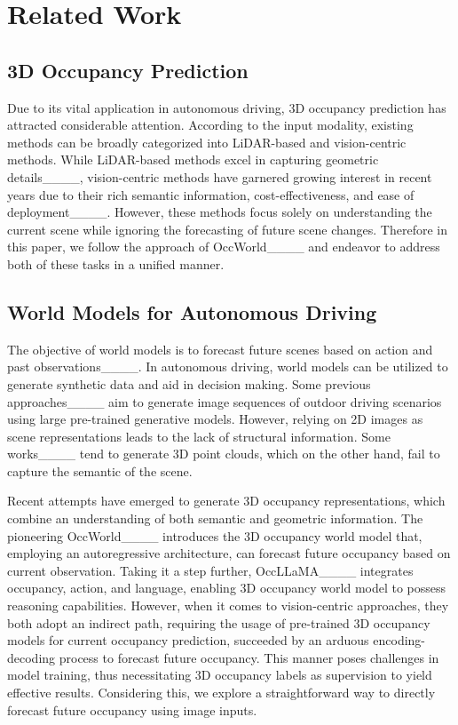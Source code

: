 \section{Related Work}
\label{related_work}

\subsection{3D Occupancy Prediction}

Due to its vital application in autonomous driving, 3D occupancy prediction has attracted considerable attention. According to the input modality, existing methods can be broadly categorized into LiDAR-based and vision-centric methods. While LiDAR-based methods excel in capturing geometric details____, vision-centric methods have garnered growing interest in recent years due to their rich semantic information, cost-effectiveness, and ease of deployment____. However, these methods focus solely on understanding the current scene while ignoring the forecasting of future scene changes. Therefore in this paper, we follow the approach of OccWorld____ and endeavor to address both of these tasks in a unified manner.

\subsection{World Models for Autonomous Driving}

The objective of world models is to forecast future scenes based on action and past observations____. In autonomous driving, world models can be utilized to generate synthetic data and aid in decision making. Some previous approaches____ aim to generate image sequences of outdoor driving scenarios using large pre-trained generative models. However, relying on 2D images as scene representations leads to the lack of structural information. Some works____ tend to generate 3D point clouds, which on the other hand, fail to capture the semantic of the scene.

Recent attempts have emerged to generate 3D occupancy representations, which combine an understanding of both semantic and geometric information. The pioneering OccWorld____ introduces the 3D occupancy world model that, employing an autoregressive architecture, can forecast future occupancy based on current observation. Taking it a step further, OccLLaMA____ integrates occupancy, action, and language, enabling 3D occupancy world model to possess reasoning capabilities. However, when it comes to vision-centric approaches, they both adopt an indirect path, requiring the usage of pre-trained 3D occupancy models for current occupancy prediction, succeeded by an arduous encoding-decoding process to forecast future occupancy. This manner poses challenges in model training, thus necessitating 3D occupancy labels as supervision to yield effective results. Considering this, we explore a straightforward way to directly forecast future occupancy using image inputs.

